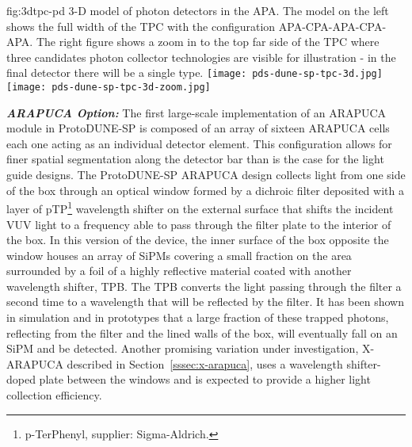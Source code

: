 \begin{dunefigure}{fig:3dtpc-pd}
{3-D model of photon detectors in the APA. The model on the left shows the full width of the TPC with the configuration APA-CPA-APA-CPA-APA. The right figure shows a zoom in to the top far side of the TPC where three candidates photon collector technologies are visible for illustration - in the final detector there will be a single type.}
\texttt{[image: pds-dune-sp-tpc-3d.jpg]}
\texttt{[image: pds-dune-sp-tpc-3d-zoom.jpg]}
\end{dunefigure}



{\it\bf ARAPUCA Option:} The first large-scale implementation of an ARAPUCA module in ProtoDUNE-SP is composed of an array of sixteen ARAPUCA cells 
each one acting as an individual detector element. This configuration allows for finer spatial segmentation along the detector bar than is the case for the light guide designs. 
The ProtoDUNE-SP ARAPUCA design collects light from one side of the box through an optical window formed  
by a dichroic filter deposited with a layer of pTP\footnote{p-TerPhenyl,  supplier: Sigma-Aldrich\textregistered.}
wavelength shifter on the external surface that shifts the incident VUV light to a frequency able to pass through the filter plate to the interior of the box.  
In this version of the device, the inner surface of the box opposite the window houses an array of SiPMs covering a small fraction on the area surrounded by a foil of a highly reflective material coated with another wavelength shifter, TPB. The TPB
converts the light passing through the filter a second time to a wavelength that will be reflected by the filter. It has been shown in simulation and in prototypes that a large fraction of these trapped photons, reflecting from the filter and the lined walls of the box, will eventually fall on an SiPM and be detected.
Another promising variation under investigation, X-ARAPUCA described in Section~\ref{sssec:x-arapuca}, uses a wavelength shifter-doped plate between the windows and is expected to provide a higher light collection efficiency.

